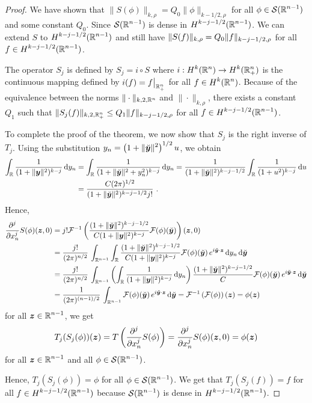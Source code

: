 \begin{proof}
We have shown that $\|S(\phi)\|_{k,\rho} = Q_0 \|\phi\|_{k-1/2,\rho}$
for all $\DS \phi \in \SS(\RR^{n-1})$ and some constant $Q_0$.
Since $\DS \SS(\RR^{n-1})$ is dense in
$\DS H^{k-j-1/2}(\RR^{n-1})$.  We can
extend $S$ to $\DS H^{k-j-1/2}(\RR^{n-1})$ and still
have $\DS \|S(f)\|_{k,\rho} = Q_0 \|f\|_{k-j-1/2,\rho}$ for all
$\DS f \in H^{k-j-1/2}(\RR^{n-1})$.

The operator $S_j$ is defined by $S_j = i \circ S$ where
$\DS i: H^{k}(\RR^n) \to H^{k}(\RR^n_+)$ is the
continuous mapping defined by $\DS i(f) = f\big|_{\RR^n_+}$ for all
$\DS f \in H^{k}(\RR^n)$.  Because of the equivalence between the
norms $\|\cdot\|_{k,2,\RR^n}$ and $\|\cdot\|_{k,\rho}$, there exists a
constant $Q_1$ such that
$\DS \|S_j(f)\|_{k,2,\RR^n_+} \leq Q_1 \|f\|_{k-j-1/2,\rho}$ for all
$\DS f \in H^{k-j-1/2}(\RR^{n-1})$.

To complete the proof of the theorem, we now show
that $S_j$ is the right inverse of $T_j$.
Using the substitution
$\DS y_n = \left(1 + \|\breve{\VEC{y}}\|^2\right)^{1/2} u$, we
obtain
\begin{align*}
\int_{\RR} \frac{1}{(1 + \|\VEC{y}\|^2)^{k-j}} \dx{y_n}
&= \int_{\RR} \frac{1}{(1 + \|\breve{\VEC{y}}\|^2 + y_n^2)^{k-j}} \dx{y_n}
= \frac{1}{(1 + \|\breve{\VEC{y}}\|^2)^{k-j-1/2}}
\int_{\RR} \frac{1}{(1 + u^2)^{k-j}} \dx{u} \\
&= \frac{C (2\pi)^{1/2}}{(1 + \|\breve{\VEC{y}}\|^2)^{k-j-1/2} j!} \ .
\end{align*}
Hence,
\begin{align*}
\pdfdxn{S(\phi)}{x_n}{j}(\VEC{z},0)
&= j! \F^{-1}\left(
\frac{(1+\|\breve{\VEC{y}}\|^2)^{k-j-1/2}}{C(1+ \|\VEC{y}\|^2)^{k-j}}
\F(\phi)(\breve{\VEC{y}}) \right)(\VEC{z},0) \\
&= \frac{j!}{(2\pi)^{n/2}}\,\int_{\RR^{n-1}} \int_{\RR} 
\frac{(1+\|\breve{\VEC{y}}\|^2)^{k-j-1/2}}{C(1+ \|\VEC{y}\|^2)^{k-j}}
\F(\phi)(\breve{\VEC{y}})\, e^{i\breve{\VEC{y}}\cdot \VEC{z}}
\dx{y_n} \dx{\breve{\VEC{y}}} \\
&= \frac{j!}{(2\pi)^{n/2}}\,\int_{\RR^{n-1}} \left(
\int_{\RR} \frac{1}{(1+ \|\VEC{y}\|^2)^{k-j}} \dx{y_n} \right)
\frac{(1+\|\breve{\VEC{y}}\|^2)^{k-j-1/2}}{C}
\F(\phi)(\breve{\VEC{y}})\, e^{i\breve{\VEC{y}}\cdot \VEC{z}}
\dx{\breve{\VEC{y}}} \\
&= \frac{1}{(2\pi)^{(n-1)/2}}\,\int_{\RR^{n-1}}
\F(\phi)(\breve{\VEC{y}})\, e^{i\breve{\VEC{y}}\cdot \VEC{z}}
\dx{\breve{\VEC{y}}} = \F^{-1}\left(\F(\phi)\right)(\VEC{z})
= \phi(\VEC{z})
\end{align*}
for all $\DS \VEC{z} \in \RR^{n-1}$, we get
\[
  T_j(S_j(\phi))(\VEC{z}) = T \left( \pdfdxn{S(\phi)}{x_n}{j} \right)
  = \pdfdxn{S(\phi)}{x_n}{j}(\VEC{z},0) = \phi(\VEC{z})
\]
for all $\DS \VEC{z} \in \RR^{n-1}$ and all
$\DS \phi \in \SS(\RR^{n-1})$.

Hence, $T_j(S_j(\phi)) = \phi$ for all
$\DS \phi \in \SS(\RR^{n-1})$.  We get
that $T_j(S_j(f)) = f$ for all $f \in \DS H^{k-j-1/2}(\RR^{n-1})$
because $\DS \SS(\RR^{n-1})$ is dense in
$\DS H^{k-j-1/2}(\RR^{n-1})$.
\end{proof}

